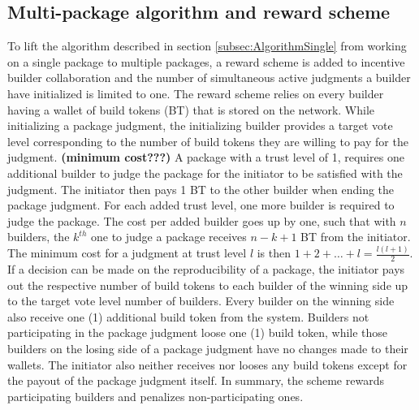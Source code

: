\subsection{Multi-package algorithm and reward scheme}
\label{subsec:AlgorithmMulti}

To lift the algorithm described in section \ref{subsec:AlgorithmSingle} from working on a single package to multiple packages, a reward scheme is added to incentive builder collaboration and the number of simultaneous active judgments a builder have initialized is limited to one. The reward scheme relies on every builder having a wallet of build tokens (BT) that is stored on the network. While initializing a package judgment, the initializing builder provides a target vote level corresponding to the number of build tokens they are willing to pay for the judgment. \textbf{(minimum cost???)} A package with a trust level of 1, requires one additional builder to judge the package for the initiator to be satisfied with the judgment. The initiator then pays 1 BT to the other builder when ending the package judgment. For each added trust level, one more builder is required to judge the package. The cost per added builder goes up by one, such that with $n$ builders, the $k^{th}$ one to judge a package receives $n - k + 1$ BT from the initiator. The minimum cost for a judgment at trust level $l$ is then $1 + 2 + \dotsc + l = \frac{l(l+1)}{2}$. If a decision can be made on the reproducibility of a package, the initiator pays out the respective number of build tokens to each builder of the winning side up to the target vote level number of builders. Every builder on the winning side also receive one (1) additional build token from the system. Builders not participating in the package judgment loose one (1) build token, while those builders on the losing side of a package judgment have no changes made to their wallets. The initiator also neither receives nor looses any build tokens except for the payout of the package judgment itself. In summary, the scheme rewards participating builders and penalizes non-participating ones.